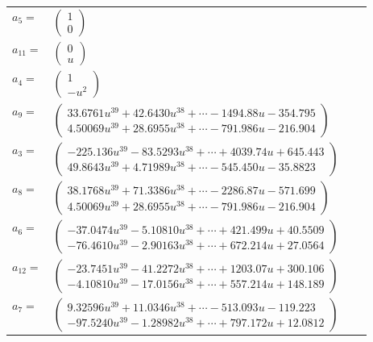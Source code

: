 \documentclass[1p]{elsarticle_modified}
\theoremstyle{definition}
\begin{document}
\begin{tabular}{m{7pt} m{180pt} m{7pt} m{180pt} }
\flushright $a_{5}=$&$\begin{pmatrix}1\\0\end{pmatrix}$ \\
\flushright $a_{11}=$&$\begin{pmatrix}0\\u\end{pmatrix}$ \\
\flushright $a_{4}=$&$\begin{pmatrix}1\\- u^2\end{pmatrix}$ \\
\flushright $a_{9}=$&$\begin{pmatrix}33.6761 u^{39}+42.6430 u^{38}+\cdots-1494.88 u-354.795\\4.50069 u^{39}+28.6955 u^{38}+\cdots-791.986 u-216.904\end{pmatrix}$ \\
\flushright $a_{3}=$&$\begin{pmatrix}-225.136 u^{39}-83.5293 u^{38}+\cdots+4039.74 u+645.443\\49.8643 u^{39}+4.71989 u^{38}+\cdots-545.450 u-35.8823\end{pmatrix}$ \\
\flushright $a_{8}=$&$\begin{pmatrix}38.1768 u^{39}+71.3386 u^{38}+\cdots-2286.87 u-571.699\\4.50069 u^{39}+28.6955 u^{38}+\cdots-791.986 u-216.904\end{pmatrix}$ \\
\flushright $a_{6}=$&$\begin{pmatrix}-37.0474 u^{39}-5.10810 u^{38}+\cdots+421.499 u+40.5509\\-76.4610 u^{39}-2.90163 u^{38}+\cdots+672.214 u+27.0564\end{pmatrix}$ \\
\flushright $a_{12}=$&$\begin{pmatrix}-23.7451 u^{39}-41.2272 u^{38}+\cdots+1203.07 u+300.106\\-4.10810 u^{39}-17.0156 u^{38}+\cdots+557.214 u+148.189\end{pmatrix}$ \\
\flushright $a_{7}=$&$\begin{pmatrix}9.32596 u^{39}+11.0346 u^{38}+\cdots-513.093 u-119.223\\-97.5240 u^{39}-1.28982 u^{38}+\cdots+797.172 u+12.0812\end{pmatrix}$ \\

\end{tabular}
\end{document}
